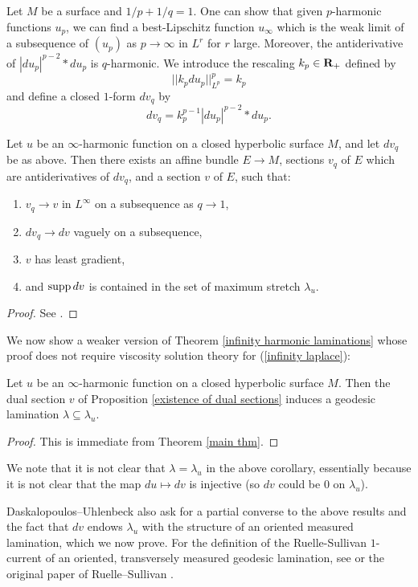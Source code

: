 Let $M$ be a surface and $1/p + 1/q = 1$.
One can show that given $p$-harmonic functions $u_p$, we can find a best-Lipschitz function $u_\infty$ which is the weak limit of a subsequence of $(u_p)$ as $p \to \infty$ in $L^r$ for $r$ large.
Moreover, the antiderivative of $|du_p|^{p - 2} * du_p$ is $q$-harmonic.
We introduce the rescaling $k_p \in \mathbf{R}_+$ defined by
$$||k_p du_p||_{L^p}^p = k_p$$
and define a closed $1$-form $dv_q$ by
$$dv_q = k_p^{p - 1} |du_p|^{p - 2} * du_p.$$

\begin{proposition}\label{existence of dual sections}
Let $u$ be an $\infty$-harmonic function on a closed hyperbolic surface $M$, and let $dv_q$ be as above. Then there exists an affine bundle $E \to M$, sections $v_q$ of $E$ which are antiderivatives of $dv_q$, and a section $v$ of $E$, such that:
\begin{enumerate}
\item $v_q \to v$ in $L^\infty$ on a subsequence as $q \to 1$,
\item $dv_q \to dv$ vaguely on a subsequence,
\item $v$ has least gradient,
\item and $\operatorname{supp} dv$ is contained in the set of maximum stretch $\lambda_u$.
\end{enumerate}
\end{proposition}
\begin{proof}
See \cite[\S6]{daskalopoulos2020transverse}.
\end{proof}

We now show a weaker version of Theorem \ref{infinity harmonic laminations} whose proof does not require viscosity solution theory for (\ref{infinity laplace}):

\begin{corollary}
Let $u$ be an $\infty$-harmonic function on a closed hyperbolic surface $M$.
Then the dual section $v$ of Proposition \ref{existence of dual sections} induces a geodesic lamination $\lambda \subseteq \lambda_u$.
\end{corollary}
\begin{proof}
This is immediate from Theorem \ref{main thm}.
\end{proof}

We note that it is not clear that $\lambda = \lambda_u$ in the above corollary, essentially because it is not clear that the map $du \mapsto dv$ is injective (so $dv$ could be $0$ on $\lambda_u$).

Daskalopoulos--Uhlenbeck also ask for a partial converse to the above results and the fact that $dv$ endows $\lambda_u$ with the structure of an oriented measured lamination, which we now prove. For the definition of the Ruelle-Sullivan $1$-current of an oriented, transversely measured geodesic lamination, see \cite[\S8]{daskalopoulos2020transverse} or the original paper of Ruelle--Sullivan \cite{Ruelle75}.

